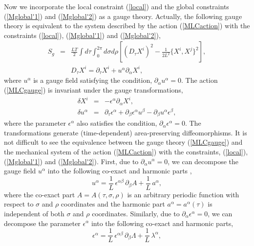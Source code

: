 \documentclass[12pt,a4paper]{article}
\newcommand{\ptau}{\partial_\tau}
\newcommand{\p}{\partial}
\begin{document}
Now we incorporate the local constraint (\ref{local}) and the global
constraints (\ref{Mglobal'1}) and (\ref{Mglobal'2}) as a gauge
theory. Actually, the following gauge theory is equivalent to the
system described by the action (\ref{MLCaction}) with the constraints
(\ref{local}), (\ref{Mglobal'1}) and (\ref{Mglobal'2}),
\begin{eqnarray}
  S_g&=&\frac{LT}{2}\int d\tau \int_0^{2\pi}d\sigma d\rho\left[
   (D_{\tau}X^i)^2-\frac{1}{2L^2}\{X^{i},X^{j}\}^2\right]\label{MLCgauge},\\
  &&D_{\tau}X^i=\ptau X^i+u^{\alpha}\p_{\alpha}X^i\nonumber,
\end{eqnarray}
where $u^{\alpha}$ is a gauge field satisfying the condition,
$\p_{\alpha}u^{\alpha}=0$.
The action (\ref{MLCgauge}) is invariant under the gauge
transformations,
\begin{eqnarray}
 \delta X^i&=&-\epsilon^{\alpha} \p_{\alpha} X^i,\label{Mgtrans1}\\
 \delta u^{\alpha} &=&\ptau\epsilon^{\alpha}
	+\p_{\beta} \epsilon^{\alpha} u^{\beta}
	-\p_{\beta} u^{\alpha} \epsilon^{\beta},\label{Mgtrans2}
\end{eqnarray}
where the parameter $\epsilon^{\alpha}$  also satisfies the condition,
$\p_{\alpha}\epsilon^{\alpha}=0$.
The transformations generate (time-dependent) area-preserving
diffeomorphisms. It is not difficult to see the equivalence between
the gauge theory (\ref{MLCgauge}) and the mechanical system of the
action (\ref{MLCaction}) with the constraints, (\ref{local}),
(\ref{Mglobal'1}) and (\ref{Mglobal'2}).
First, due to $\p_{\alpha}u^{\alpha}=0$, we can decompose the gauge
field $u^{\alpha}$ into the following co-exact and harmonic parts
\cite{FI,BPS,dWMN},
\begin{equation}
  u^{\alpha}=\frac{1}{L}\,\epsilon^{\alpha\beta}\,\p_{\beta}A
	+\frac{1}{L}\,a^{\alpha},\label{gauge}
\end{equation}
where the co-exact part $A=A(\tau,\sigma,\rho)$ is an
arbitrary periodic function with respect to $\sigma$ and $\rho$
coordinates and the harmonic part $a^{\alpha}=a^{\alpha}(\tau)$
is independent of both $\sigma$ and $\rho$ coordinates.
Similarly, due to $\p_{\alpha}\epsilon^{\alpha}=0$, we can decompose
the parameter $\epsilon^{\alpha}$ into the following co-exact and
harmonic parts,
\begin{equation}\label{parameter}
  \epsilon^{\alpha}=\frac{1}{L}\,\epsilon^{\alpha\beta}\,
	\p_{\beta}\Lambda +\frac{1}{L}\,\lambda^{\alpha},
\end{equation}
\end{document}

